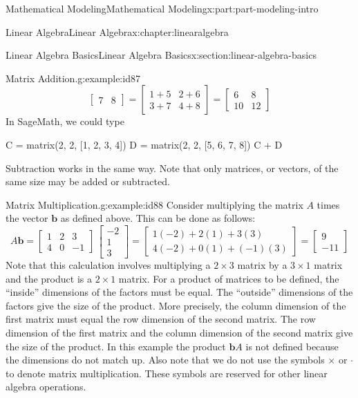 \documentclass[oneside,10pt,]{book}
\numberwithin{equation}{section}
\begin{document}
\begin{partptx}{Mathematical Modeling}{}{Mathematical Modeling}{}{}{x:part:part-modeling-intro}
\begin{chapterptx}{Linear Algebra}{}{Linear Algebra}{}{}{x:chapter:linearalgebra}
\begin{sectionptx}{Linear Algebra Basics}{}{Linear Algebra Basics}{}{}{x:section:linear-algebra-basics}
\begin{example}{Matrix Addition.}{g:example:id87}
\begin{equation*}
\begin{bmatrix}
7 & 8
\end{bmatrix} = \begin{bmatrix}
1+ 5 & 2+6 \\
3+7 & 4+8
\end{bmatrix} = \begin{bmatrix}
6 & 8 \\
10 & 12
\end{bmatrix}
\end{equation*}
In SageMath, we could type%
\begin{sageinput}
C = matrix(2, 2, [1, 2, 3, 4])
D = matrix(2, 2, [5, 6, 7, 8])
C + D
\end{sageinput}
\begin{sageoutput}
[ 6  8]
[10 12]
\end{sageoutput}
Subtraction works in the same way. Note that only matrices, or vectors, of the same size may be added or subtracted.%
\end{example}
\begin{example}{Matrix Multiplication.}{g:example:id88}%
Consider multiplying the matrix \(A\) times the vector \(\mathbf{b}\) as defined above. This can be done as follows:%
%
\begin{equation*}
A\mathbf{b} = \begin{bmatrix}
1 & 2 & 3 \\
4 & 0 & -1 
\end{bmatrix}\,\begin{bmatrix}
-2 \\
1 \\
3
\end{bmatrix} = \begin{bmatrix}
1(-2) + 2(1) + 3(3) \\
4(-2) + 0(1) + (-1)(3)
\end{bmatrix} = \begin{bmatrix}
9 \\
-11
\end{bmatrix}
\end{equation*}
Note that this calculation involves multiplying a \(2 \times 3\) matrix by a \(3 \times 1\) matrix and the product is a \(2\times 1\) matrix. For a product of matrices to be defined, the ``inside'' dimensions of the factors must be equal. The ``outside'' dimensions of the factors give the size of the product. More precisely, the column dimension of the first matrix must equal the row dimension of the second matrix. The row dimension of the first matrix and the column dimension of the second matrix give the size of the product. In this example the product \(\mathbf{b}A\) is not defined because the dimensions do not match up. Also note that we do not use the symbols \(\times\) or \(\cdot\) to denote matrix multiplication. These symbols are reserved for other linear algebra operations.%

\end{example}
\end{sectionptx}
\end{chapterptx}
\end{partptx}
\end{document}
